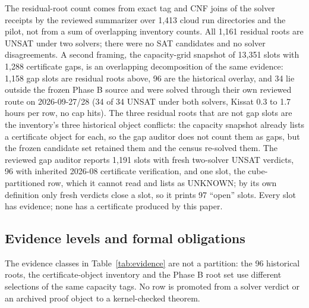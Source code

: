 \documentclass{anvil-paper}
\theoremstyle{definition}
\begin{document}
The residual-root count comes from exact tag and CNF joins of the solver receipts by the reviewed summarizer over 1,413 cloud run directories and the pilot, not from a sum of overlapping inventory counts. All 1,161 residual roots are UNSAT under two solvers; there were no SAT candidates and no solver disagreements. A second framing, the capacity-grid snapshot of 13,351 slots with 1,288 certificate gaps, is an overlapping decomposition of the same evidence: 1,158 gap slots are residual roots above, 96 are the historical overlay, and 34 lie outside the frozen Phase B source and were solved through their own reviewed route on 2026-09-27/28 (34 of 34 UNSAT under both solvers, Kissat 0.3 to 1.7 hours per row, no cap hits). The three residual roots that are not gap slots are the inventory's three historical object conflicts: the capacity snapshot already lists a certificate object for each, so the gap auditor does not count them as gaps, but the frozen candidate set retained them and the census re-solved them. The reviewed gap auditor reports 1,191 slots with fresh two-solver UNSAT verdicts, 96 with inherited 2026-08 certificate verification, and one slot, the cube-partitioned row, which it cannot read and lists as UNKNOWN; by its own definition only fresh verdicts close a slot, so it prints 97 ``open'' slots. Every slot has evidence; none has a certificate produced by this paper.

\subsection{Evidence levels and formal obligations}\label{sec:evidence}

The evidence classes in Table~\ref{tab:evidence} are not a partition: the 96 historical roots, the certificate-object inventory and the Phase B root set use different selections of the same capacity tags. No row is promoted from a solver verdict or an archived proof object to a kernel-checked theorem.
\end{document}
